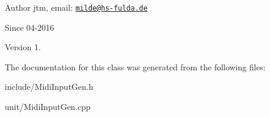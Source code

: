 \begin{DoxyAuthor}{Author}
jtm, email\+:  \href{mailto:milde@hs-fulda.de}{\tt milde@hs-\/fulda.\+de} 
\end{DoxyAuthor}
\begin{DoxySince}{Since}
04-\/2016 
\end{DoxySince}
\begin{DoxyVersion}{Version}
1. 
\end{DoxyVersion}


The documentation for this class was generated from the following files\+:\begin{DoxyCompactItemize}
\item 
include/Midi\+Input\+Gen.\+h\item 
unit/Midi\+Input\+Gen.\+cpp\end{DoxyCompactItemize}
